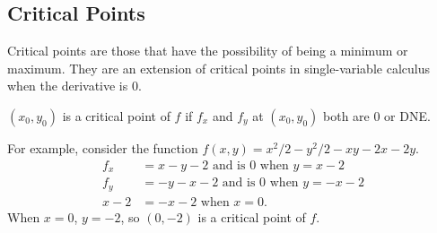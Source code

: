 \subsection{Critical Points}
\noindent
Critical points are those that have the possibility of being a minimum or maximum.
They are an extension of critical points in single-variable calculus when the derivative is 0.\\

\noindent
\begin{definition}
	$(x_0, y_0)$ is a critical point of $f$ if $f_x$ and $f_y$ at $(x_0, y_0)$ both are 0 or DNE.
\end{definition}

\noindent
For example, consider the function $f(x,y) = x^2/2 - y^2/2 - xy - 2x - 2y$.
\begin{align*}
	f_x &= x - y - 2	\text{ and is } 0 \text{ when } y = x-2 \\
	f_y &= -y - x - 2 \text{ and is } 0 \text{ when } y = -x-2 \\
	x - 2 &= -x -2 \text{ when } x = 0.
\end{align*}
When $x = 0$, $ y =-2$, so $(0, -2)$ is a critical point of $f$.

